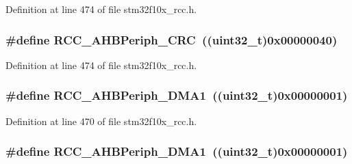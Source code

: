 Definition at line 474 of file stm32f10x\+\_\+rcc.\+h.

\subsubsection[{\texorpdfstring{R\+C\+C\+\_\+\+A\+H\+B\+Periph\+\_\+\+C\+RC}{RCC_AHBPeriph_CRC}}]{\setlength{\rightskip}{0pt plus 5cm}\#define R\+C\+C\+\_\+\+A\+H\+B\+Periph\+\_\+\+C\+RC~(({\bf uint32\+\_\+t})0x00000040)}\hypertarget{group___a_h_b__peripheral_gaef0cd08bcf96323324f328675ccd5ac3}{}\label{group___a_h_b__peripheral_gaef0cd08bcf96323324f328675ccd5ac3}


Definition at line 474 of file stm32f10x\+\_\+rcc.\+h.

\subsubsection[{\texorpdfstring{R\+C\+C\+\_\+\+A\+H\+B\+Periph\+\_\+\+D\+M\+A1}{RCC_AHBPeriph_DMA1}}]{\setlength{\rightskip}{0pt plus 5cm}\#define R\+C\+C\+\_\+\+A\+H\+B\+Periph\+\_\+\+D\+M\+A1~(({\bf uint32\+\_\+t})0x00000001)}\hypertarget{group___a_h_b__peripheral_gaf32783f8481c4343726994073918b3ff}{}\label{group___a_h_b__peripheral_gaf32783f8481c4343726994073918b3ff}


Definition at line 470 of file stm32f10x\+\_\+rcc.\+h.

\subsubsection[{\texorpdfstring{R\+C\+C\+\_\+\+A\+H\+B\+Periph\+\_\+\+D\+M\+A1}{RCC_AHBPeriph_DMA1}}]{\setlength{\rightskip}{0pt plus 5cm}\#define R\+C\+C\+\_\+\+A\+H\+B\+Periph\+\_\+\+D\+M\+A1~(({\bf uint32\+\_\+t})0x00000001)}\hypertarget{group___a_h_b__peripheral_gaf32783f8481c4343726994073918b3ff}{}\label{group___a_h_b__peripheral_gaf32783f8481c4343726994073918b3ff}


